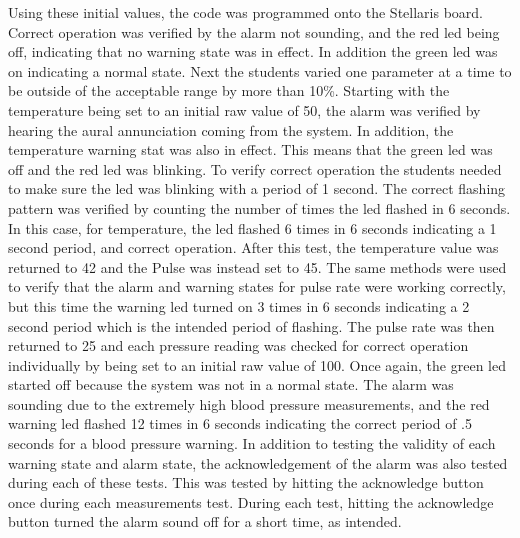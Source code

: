 \documentclass[12pt]{article} %
\begin{document}
Using these initial values, the code was programmed onto the Stellaris board.
Correct operation was verified by the alarm not sounding, and the red led being
off, indicating that no warning state was in effect. In addition the green led
was on indicating a normal state. Next the students varied one parameter at a
time to be outside of the acceptable range by more than 10\%. Starting with the
temperature being set to an initial raw value of 50, the alarm was verified by
hearing the aural annunciation coming from the system. In addition, the
temperature warning stat was also in effect. This means that the green led was
off and the red led was blinking. To verify correct operation the students
needed to make sure the led was blinking with a period of 1 second. The correct
flashing pattern was verified by counting the number of times the led flashed
in 6 seconds. In this case, for temperature, the led flashed 6 times in 6
seconds indicating a 1 second period, and correct operation. After this test,
the temperature value was returned to 42 and the Pulse was instead set to 45.
The same methods were used to verify that the alarm and warning states for
pulse rate were working correctly, but this time the warning led turned on 3
times in 6 seconds indicating a 2 second period which is the intended period of
flashing. The pulse rate was then returned to 25 and each pressure reading was
checked for correct operation individually by being set to an initial raw value
of 100. Once again, the green led started off because the system was not in a
normal state. The alarm was sounding due to the extremely high blood pressure
measurements, and the red warning led flashed 12 times in 6 seconds indicating
the correct period of .5 seconds for a blood pressure warning. In addition to
testing the validity of each warning state and alarm state, the acknowledgement
of the alarm was also tested during each of these tests. This was tested by
hitting the acknowledge button once during each measurements test. During each
test, hitting the acknowledge button turned the alarm sound off for a short
time, as intended. 
\end{document}
